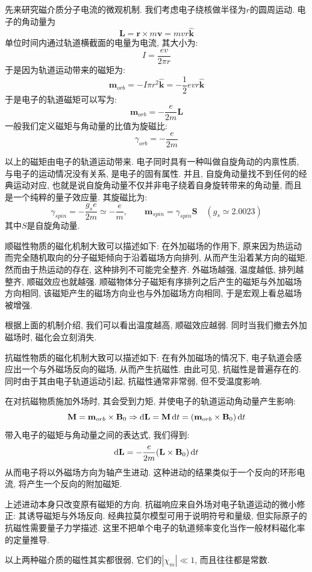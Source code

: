 先来研究磁介质分子电流的微观机制. 我们考虑电子绕核做半径为$r$的圆周运动. 电子的角动量为
\[
\mathbf L=\mathbf r\times m\mathbf v=mvr\hat{\mathbf k}
\]
单位时间内通过轨道横截面的电量为电流, 其大小为:
\[
I=\frac{ev}{2\pi r}
\]
于是因为轨道运动带来的磁矩为:
\[
\mathbf{m}_{orb} = -I\pi r^2\hat{\mathbf k}=-\frac{1}{2}evr\hat{\mathbf k}
\]
于是电子的轨道磁矩可以写为:
\[
\mathbf{m}_{orb}=-\frac{e}{2m}\mathbf{L}
\]
一般我们定义磁矩与角动量的比值为旋磁比:
\[
\gamma_{orb}=-\frac{e}{2m}
\]

以上的磁矩由电子的轨道运动带来. 电子同时具有一种叫做自旋角动的内禀性质, 与电子的运动情况没有关系, 是电子的固有属性. 并且, 自旋角动量找不到任何的经典运动对应, 也就是说自旋角动量不仅并非电子绕着自身旋转带来的角动量, 而且是一个纯粹的量子效应量. 其旋磁比为:
\[
\gamma_{spin}=-\frac{g_s e}{2m}\simeq-\frac{e}{m},\qquad \mathbf m_{spin}=\gamma_{spin}\mathbf S\quad(g_s\simeq2.0023)
\]
其中$S$是自旋角动量.

顺磁性物质的磁化机制大致可以描述如下: 在外加磁场的作用下, 原来因为热运动而完全随机取向的分子磁矩倾向于沿着磁场方向排列, 从而产生沿着某方向的磁矩. 然而由于热运动的存在, 这种排列不可能完全整齐. 外磁场越强, 温度越低, 排列越整齐, 顺磁效应也就越强. 顺磁物体分子磁矩有序排列之后产生的磁矩与外加磁场方向相同, 该磁矩产生的磁场方向业也与外加磁场方向相同, 于是宏观上看总磁场被增强.

根据上面的机制介绍, 我们可以看出温度越高, 顺磁效应越弱. 同时当我们撤去外加磁场时, 磁化会立刻消失.

抗磁性物质的磁化机制大致可以描述如下: 在有外加磁场的情况下, 电子轨道会感应出一个与外磁场反向的磁场, 从而产生抗磁性. 由此可见, 抗磁性是普遍存在的. 同时由于其由电子轨道运动引起, 抗磁性通常非常弱, 但不受温度影响.

在对抗磁物质施加外场时, 其会受到力矩, 并使电子的轨道运动角动量产生影响:
\[
\mathbf{M} = \mathbf{m}_{orb}\times \mathbf{B}_0 \Rightarrow \mathop{}\!\mathrm{d} \mathbf{L} = \mathbf{M} \mathop{}\!\mathrm{d} t = (\mathbf{m}_{orb}\times \mathbf{B}_0)\mathop{}\!\mathrm{d} t
\]
带入电子的磁矩与角动量之间的表达式, 我们得到:
\[
\mathop{}\!\mathrm{d} \mathbf{L} = -\frac{e}{2m}(\mathbf{L}\times\mathbf{B}_0) \mathop{}\!\mathrm{d} t
\]
从而电子将以外磁场方向为轴产生进动. 这种进动的结果类似于一个反向的环形电流, 将产生一个反向的附加磁矩.

上述进动本身只改变原有磁矩的方向. 抗磁响应来自外场对电子轨道运动的微小修正: 其诱导磁矩与外场反向. 经典拉莫尔模型可用于说明符号和量级, 但实际原子的抗磁性需要量子力学描述. 这里不把单个电子的轨道频率变化当作一般材料磁化率的定量推导.

以上两种磁介质的磁性其实都很弱, 它们的$|\chi_m|\ll 1$, 而且往往都是常数.

